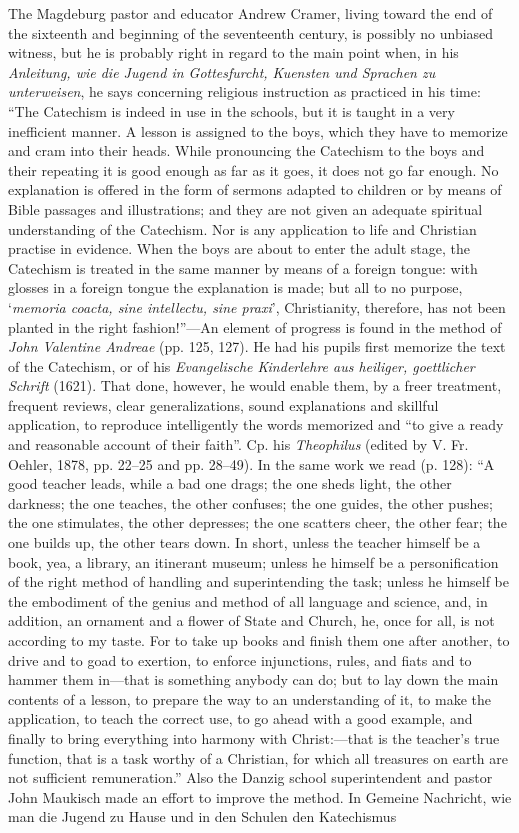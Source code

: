 The Magdeburg pastor and educator Andrew Cramer, living toward the end of the sixteenth and beginning of the seventeenth century, is possibly no unbiased witness, but he is probably right in regard to the main point when, in his \emph{Anleitung, wie die Jugend in Gottesfurcht, Kuensten und Sprachen zu unterweisen}, he says concerning religious instruction as practiced in his time: “The Catechism is indeed in use in the schools, but it is taught in a very inefficient manner. A lesson is assigned to the boys, which they have to memorize and cram into their heads. While pronouncing the Catechism to the boys and their repeating it is good enough as far as it goes, it does not go far
enough. No explanation is offered in the form of sermons adapted to children or by means of Bible passages and illustrations; and they are not given an adequate spiritual understanding of the Catechism. Nor is any application to life and Christian practise in evidence. When the boys are about to enter the adult stage, the Catechism is treated in the same manner by means of a foreign tongue: with glosses in a foreign tongue the explanation is made; but all to no purpose, ‘\emph{memoria coacta, sine intellectu, sine praxi}’, Christianity, therefore, has not been planted in the right fashion!”—An element of progress is found in the method of \emph{John Valentine Andreae} (pp. 125, 127). He had his pupils first memorize the text of the Catechism, or of his \emph{Evangelische Kinderlehre aus heiliger, goettlicher Schrift} (1621). That done, however, he would enable them, by a freer treatment, frequent reviews, clear generalizations, sound explanations and skillful application, to reproduce intelligently the words memorized and “to give a ready and reasonable account of their faith”. Cp. his \emph{Theophilus} (edited by V. Fr. Oehler, 1878, pp. 22–25 and pp. 28–49). In the same work we read (p. 128): “A good teacher leads, while a bad one drags; the one sheds light, the other darkness; the one teaches, the other confuses; the one guides, the other pushes; the one stimulates, the other depresses; the one scatters cheer, the other fear; the one builds up, the other tears down. In short, unless the teacher himself be a book, yea, a library, an itinerant museum; unless he himself be a personification of the right method of handling and superintending the task; unless he himself be the embodiment of the genius and method of all language and science, and, in addition, an ornament and a flower of State and Church, he, once for all, is not according to my taste. For to take up books and finish them one after another, to drive and to goad to exertion, to enforce injunctions, rules, and fiats and to hammer them in—that is something anybody can do; but to lay down the main contents of a lesson, to prepare the way to an understanding of it, to make the application, to teach the correct use, to go ahead with a good example, and finally to bring everything into harmony with Christ:—that is the teacher’s true function, that is a task worthy of a Christian, for which all treasures on earth are not sufficient remuneration.” Also the Danzig school superintendent and pastor John Maukisch made an effort to improve the method. In Gemeine Nachricht, wie man die Jugend zu Hause und in den Schulen den Katechismus 